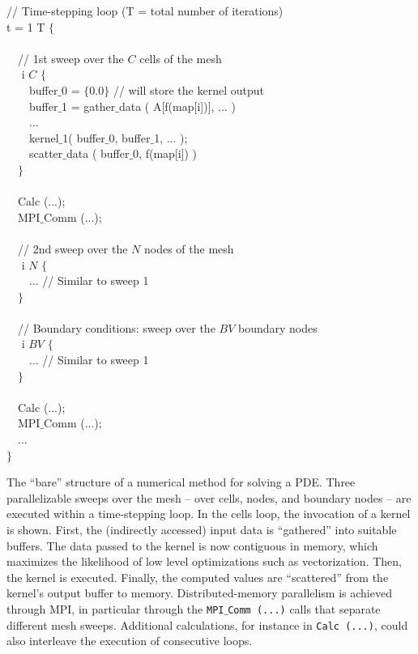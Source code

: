 \begin{algorithm}[t]
\scriptsize\ttfamily
{}

// Time-stepping loop (T = total number of iterations)\\
 t = 1  T $\lbrace$\\
~\\
~~// 1st sweep over the $C$ cells of the mesh\\
~~ i  $C$ $\lbrace$\\
~~~~buffer$\_$0 = $\lbrace 0.0 \rbrace$  // will store the kernel output\\
~~~~buffer$\_$1 = gather$\_$data ( A[f(map[i])], ... )\\
~~~~...\\
~~~~kernel$\_$1( buffer$\_$0, buffer$\_$1, ... );\\
~~~~scatter$\_$data ( buffer$\_$0, f(map[i]) )\\
~~$\rbrace$\\
~\\
~~Calc (...);\\
~~MPI$\_$Comm (...); \\
~\\
~~// 2nd sweep over the $N$ nodes of the mesh\\
~~ i  $N$ $\lbrace$\\
~~~~... // Similar to sweep 1 \\
~~$\rbrace$\\
~\\
~~// Boundary conditions: sweep over the $BV$ boundary nodes\\
~~ i  $BV$ $\lbrace$\\
~~~~... // Similar to sweep 1 \\
~~$\rbrace$\\
~\\
~~Calc (...);\\
~~MPI$\_$Comm (...); \\
~~...\\
$\rbrace$
\caption{The ``bare'' structure of a numerical method for solving a PDE. Three parallelizable sweeps over the mesh -- over cells, nodes, and boundary nodes -- are executed within a time-stepping loop. In the cells loop, the invocation of a kernel is shown. First, the (indirectly accessed) input data is ``gathered'' into suitable buffers. The data passed to the kernel is now contiguous in memory, which maximizes the likelihood of low level optimizations such as vectorization. Then, the kernel is executed. Finally, the computed values are ``scattered'' from the kernel's output buffer to memory. Distributed-memory parallelism is achieved through MPI, in particular through the {\tt MPI$\_$Comm (...)} calls that separate different mesh sweeps. Additional calculations, for instance in {\tt Calc (...)}, could also interleave the execution of consecutive loops.}
\label{code:tiling-struct}
\end{algorithm}

